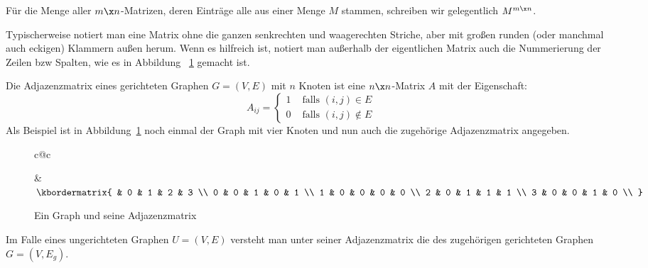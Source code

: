 Für die Menge aller $m\x n$-Matrizen, deren Einträge alle aus einer
Menge $M$ stammen, schreiben wir gelegentlich $M^{m\x n}$.

Typischerweise notiert man eine Matrix ohne die ganzen senkrechten und
waagerechten Striche, aber mit großen runden (oder manchmal auch
eckigen) Klammern außen herum. Wenn es hilfreich ist, notiert man
außerhalb der eigentlichen Matrix auch die Nummerierung der Zeilen bzw
Spalten, wie es \zB in Abbildung ~\ref{abb:adj-mat-2} gemacht ist.

Die Adjazenzmatrix eines gerichteten Graphen $G=(V,E)$ mit $n$ Knoten
ist eine $n\x n$-Matrix $A$ mit der Eigenschaft:
\[
A_{ij} = \begin{cases}
  1 & \text{ falls } (i,j)\in E \\
  0 & \text{ falls } (i,j)\notin E
\end{cases}
\]
%
Als Beispiel ist in Abbildung~\ref{abb:adj-mat-2} noch
einmal der Graph mit vier Knoten und nun auch die zugehörige
Adjazenzmatrix angegeben.

\begin{figure}[ht]
  \centering
  \begin{tabular}{c@{\hspace*{15mm}}c}
    &
    $\kbordermatrix{
      & 0 & 1 & 2 & 3 \\
      0 & 0 & 1 & 0 & 1 \\
      1 & 0 & 0 & 0 & 0 \\
      2 & 0 & 1 & 1 & 1 \\
      3 & 0 & 0 & 1 & 0 \\
    }$
  \end{tabular}
  \caption{Ein Graph und seine Adjazenzmatrix}
  \label{abb:adj-mat-2}
\end{figure}

\noindent
Im Falle eines ungerichteten Graphen $U=(V,E)$ versteht man unter
seiner Adjazenzmatrix die des zugehörigen gerichteten Graphen
$G=(V,E_g)$.

